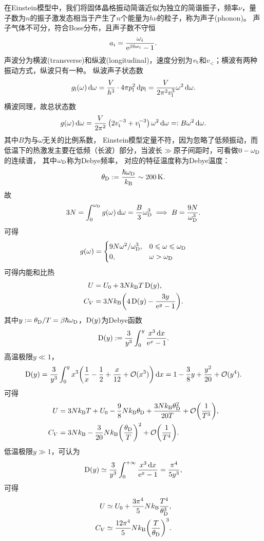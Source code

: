 在Einstein模型中，我们将固体晶格振动简谐近似为独立的简谐振子，频率$\nu$，量子数为$n$的振子激发态相当于产生了$n$个能量为$h\nu$的粒子，称为声子(phonon)。
声子气体不可分，符合Bose分布，且声子数不守恒
\[
	a_i=\frac{\omega_i}{\mathop{}\!\mathrm{e}^{\beta h\nu_i}-1}.
\]
声波分为横波(transverse)和纵波(longitudinal)，速度分别为$v_\mathrm t$和$v_\lt$；横波有两种振动方式，纵波只有一种。
纵波声子状态数
\[
	g_\mathrm l(\omega)\mathop{}\!\mathrm{d}\omega=\frac V{h^3}\cdot 4\pi p_\mathrm l^2\mathop{}\!\mathrm{d} p_\mathrm l=\frac V{2\pi^2v_\mathrm l^3}\omega^2\mathop{}\!\mathrm{d}\omega.
\]
横波同理，故总状态数
\[
	g(\omega)\mathop{}\!\mathrm{d}\omega=\frac V{2\pi^2}\left(2v_\mathrm t^{-3}+v_\mathrm l^{-3}\right)\omega^2\mathop{}\!\mathrm{d}\omega=:B\omega^2\mathop{}\!\mathrm{d}\omega.
\]
其中$B$为与$\omega$无关的比例系数，
Einstein模型定量不符，因为忽略了低频振动，而低温下的热激发主要在低频（长波）部分，当波长$\gg$原子间距时，可看做$0-\omega_\mathrm D$的连续谱，
其中$\omega_\mathrm D$称为Debye频率，
对应的特征温度称为Debye温度：
\[
	\theta_\Db:=\frac{\hbar\omega_\Db}\kB\sim\SI{200}\K.
\]
故
\[
	3N=\int_0^{\omega_\mathrm D}g(\omega)\mathop{}\!\mathrm{d}\omega=\frac B3\omega_\mathrm D^3\implies B=\frac{9N}{\omega_\mathrm D^3}.
\]
可得
\[
	g(\omega)=\begin{cases}
		9N\omega^2/\omega_\mathrm D^3,&0\leqslant\omega\leqslant\omega_\mathrm D\\
		0,&\omega>\omega_\mathrm D
	\end{cases}
\]
可得内能和比热
\begin{subequations}
	\begin{align}
		U&=U_0+3Nk_{\mathrm B} T\operatorname{D}(y),\\
		C_V&=3Nk_{\mathrm B}\biggl(4\operatorname{D}(y)-\frac{3y}{\mathop{}\!\mathrm{e}^ y-1}\biggr).
	\end{align}
\end{subequations}
其中$y:=\theta_\mathrm D/T=\beta\hbar\omega_\mathrm D$，$\operatorname{D}(y)$为Debye函数
\[
	\operatorname{D}(y):=\frac 3{y^3}\int_0^{y}\frac{x^3\mathop{}\!\mathrm{d} x}{\mathop{}\!\mathrm{e}^ x-1}.
\]
高温极限$y\ll 1$，
\[
	\operatorname{D}(y)=\frac3{y^3}\int_0^y x^3\biggl(\frac1x-\frac12+\frac x{12}+\mathcal O(x^3)\biggr)\mathop{}\!\mathrm{d} x=1-\frac38y+\frac{y^2}{20}+\mathcal O(y^4).
\]
可得 
\begin{subequations}
	\begin{align}
		U&=3Nk_{\mathrm B} T+U_0-\frac98Nk_{\mathrm B}\theta_\mathrm D+\frac{3Nk_{\mathrm B}\theta_\mathrm D^2}{20T}+\mathcal O\biggl(\frac1{T^3}\biggr),\\
		C_V&=3Nk_{\mathrm B}-\frac3{20}Nk_{\mathrm B}\biggl(\frac{\theta_\mathrm D}T\biggr)^2+\mathcal O\biggl(\frac1{T^4}\biggr).
	\end{align}
\end{subequations}
低温极限$y\gg 1$，可认为
\[
	\operatorname{D}(y)\simeq\frac3{y^3}\int_0^{+\infty}\frac{x^3\mathop{}\!\mathrm{d} x}{\mathop{}\!\mathrm{e}^ x-1}=\frac{\pi^4}{5y^3},
\]
可得
\begin{subequations}
	\begin{align}
		U&\simeq U_0+\frac{3\pi^4}5Nk_{\mathrm B}\frac{T^4}{\theta_\mathrm D^3},\\
		\label{eq:CV Debye}
		C_V&\simeq\frac{12\pi^4}5Nk_{\mathrm B}\biggl(\frac T{\theta_\mathrm D}\biggr)^3.
	\end{align}
\end{subequations}
